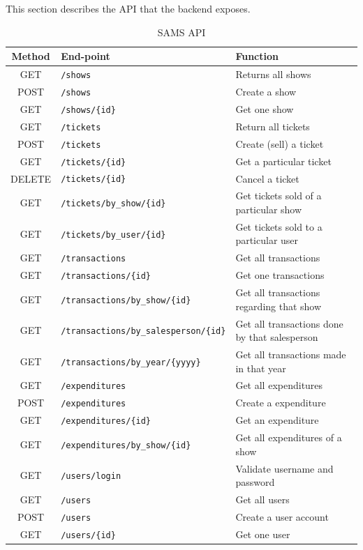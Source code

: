 \documentclass{scrreprt}
\begin{document}
This section describes the API that the backend exposes.
\begin{table} 
	\centering
	\caption{SAMS API}
	\smallskip
	\begin{tabular}{cll}
		\toprule
		\textbf{Method} & \textbf{End-point} & \textbf{Function} \\
		\midrule
		GET & \texttt{/shows} & Returns all shows \\
		POST & \texttt{/shows} & Create a show \\
		GET & \texttt{/shows/\{id\}} & Get one show \\
		\midrule
		GET & \texttt{/tickets} & Return all tickets \\
		POST & \texttt{/tickets} & Create (sell) a ticket \\
		GET & \texttt{/tickets/\{id\}} & Get a particular ticket \\
		DELETE & \texttt{/tickets/\{id\}} & Cancel a ticket \\
		GET & \texttt{/tickets/by\_show/\{id\}} & Get tickets sold of a particular show \\
		GET & \texttt{/tickets/by\_user/\{id\}} & Get tickets sold to a particular user \\
		\midrule
		GET & \texttt{/transactions} & Get all transactions \\
		GET & \texttt{/transactions/\{id\}} & Get one transactions \\
		GET & \texttt{/transactions/by\_show/\{id\}} & Get all transactions regarding that show \\
		GET & \texttt{/transactions/by\_salesperson/\{id\}} & Get all transactions done by that salesperson\\
		GET & \texttt{/transactions/by\_year/\{yyyy\}} & Get all transactions made in that year \\
		\midrule
		GET & \texttt{/expenditures} & Get all expenditures \\
		POST & \texttt{/expenditures} & Create a expenditure \\
		GET & \texttt{/expenditures/\{id\}} & Get an expenditure \\
		GET & \texttt{/expenditures/by\_show/\{id\}} & Get all expenditures of a show \\
		\midrule
		GET & \texttt{/users/login} & Validate username and password \\
		GET & \texttt{/users} & Get all users \\
		POST & \texttt{/users} & Create a user account \\
		GET & \texttt{/users/\{id\}} & Get one user \\
		\bottomrule
	\end{tabular}
\end{table}
\end{document}
